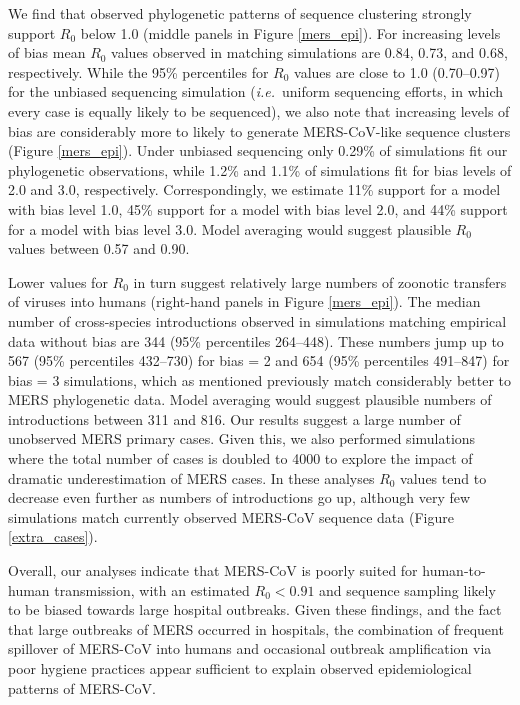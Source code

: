 \documentclass[11pt,oneside,letterpaper]{article}
\begin{document}
We find that observed phylogenetic patterns of sequence clustering strongly support $R_{0}$ below 1.0 (middle panels in Figure \ref{mers_epi}).
For increasing levels of bias mean $R_{0}$ values observed in matching simulations are 0.84, 0.73, and 0.68, respectively.
While the 95\% percentiles for $R_{0}$ values are close to 1.0 (0.70--0.97) for the unbiased sequencing simulation (\textit{i.e.}\ uniform sequencing efforts, in which every case is equally likely to be sequenced), we also note that increasing levels of bias are considerably more to likely to generate MERS-CoV-like sequence clusters (Figure \ref{mers_epi}).
Under unbiased sequencing only 0.29\% of simulations fit our phylogenetic observations, while 1.2\% and 1.1\% of simulations fit for bias levels of 2.0 and 3.0, respectively.
Correspondingly, we estimate 11\% support for a model with bias level 1.0, 45\% support for a model with bias level 2.0, and 44\% support for a model with bias level 3.0.
Model averaging would suggest plausible $R_0$ values between 0.57 and 0.90.

Lower values for $R_{0}$ in turn suggest relatively large numbers of zoonotic transfers of viruses into humans (right-hand panels in Figure \ref{mers_epi}).
The median number of cross-species introductions observed in simulations matching empirical data without bias are 344 (95\% percentiles 264--448).
These numbers jump up to 567 (95\% percentiles 432--730) for bias = 2 and 654 (95\% percentiles 491--847) for bias = 3 simulations, which as mentioned previously match considerably better to MERS phylogenetic data.
Model averaging would suggest plausible numbers of introductions between 311 and 816.
Our results suggest a large number of unobserved MERS primary cases.
Given this, we also performed simulations where the total number of cases is doubled to 4000 to explore the impact of dramatic underestimation of MERS cases.
In these analyses $R_{0}$ values tend to decrease even further as numbers of introductions go up, although very few simulations match currently observed MERS-CoV sequence data (Figure \ref{extra_cases}).

Overall, our analyses indicate that MERS-CoV is poorly suited for human-to-human transmission, with an estimated $R_{0}<0.91$ and sequence sampling likely to be biased towards large hospital outbreaks.
Given these findings, and the fact that large outbreaks of MERS occurred in hospitals, the combination of frequent spillover of MERS-CoV into humans and occasional outbreak amplification via poor hygiene practices \citep{assiri_hospital_2013,chen_comparative_2017} appear sufficient to explain observed epidemiological patterns of MERS-CoV.
\end{document}
